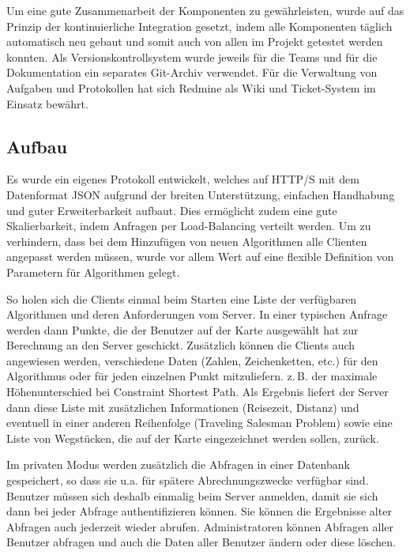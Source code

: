Um eine gute Zusammenarbeit der Komponenten zu gewährleisten, wurde auf das Prinzip der kontinuierliche Integration gesetzt, indem alle Komponenten täglich automatisch neu gebaut und somit auch von allen im Projekt getestet werden konnten.
Als Versionskontrollsystem wurde jeweils für die Teams und für die Dokumentation ein separates Git-Archiv verwendet. Für die Verwaltung von Aufgaben und Protokollen hat sich Redmine als Wiki und Ticket-System im Einsatz bewährt.

\subsection*{Aufbau}
Es wurde ein eigenes Protokoll entwickelt, welches auf \mbox{HTTP/S} mit dem Datenformat JSON aufgrund der breiten Unterstützung, einfachen Handhabung und guter Erweiterbarkeit aufbaut.
Dies ermöglicht zudem eine gute Skalierbarkeit, indem Anfragen per Load-Balancing verteilt werden.
Um zu verhindern, dass bei dem Hinzufügen von neuen Algorithmen alle Clienten angepasst werden müssen, wurde vor allem Wert auf eine flexible Definition von Parametern für Algorithmen gelegt.

So holen sich die Clients einmal beim Starten eine Liste der verfügbaren Algorithmen und deren Anforderungen vom Server. In einer typischen Anfrage werden dann Punkte, die der Benutzer auf der Karte ausgewählt hat zur Berechnung an den Server geschickt. Zusätzlich können die Clients auch angewiesen werden, verschiedene Daten (Zahlen, Zeichenketten, etc.) für den Algorithmus oder für jeden einzelnen Punkt mitzuliefern. z.\,B. der maximale Höhenunterschied bei Constraint Shortest Path. Als Ergebnis liefert der Server dann diese Liste mit zusätzlichen Informationen (Reisezeit, Distanz) und eventuell in einer anderen Reihenfolge (Traveling Salesman Problem) sowie eine Liste von Wegstücken, die auf der Karte eingezeichnet werden sollen, zurück.

Im privaten Modus werden zusätzlich die Abfragen in einer Datenbank gespeichert, so dass sie u.a. für spätere Abrechnungszwecke verfügbar sind. Benutzer müssen sich deshalb einmalig beim Server anmelden, damit sie sich dann bei jeder Abfrage authentifizieren können. Sie können die Ergebnisse alter Abfragen auch jederzeit wieder abrufen. Administratoren können Abfragen aller Benutzer abfragen und auch die Daten aller Benutzer ändern oder diese löschen. 	